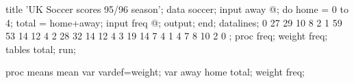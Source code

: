 \begin{listing}
title 'UK Soccer scores 95/96 season';
data soccer;
   input away @;
   do home = 0 to 4;
      total = home+away;
      input freq @;
      output;
      end;
datalines;
0   27 29 10  8  2
1   59 53 14 12  4
2   28 32 14 12  4
3   19 14  7  4  1
4    7  8 10  2  0
;
proc freq;
   weight freq;
   tables total;
run;

proc means mean var vardef=weight;
   var away home total;
   weight freq;
\end{listing}
